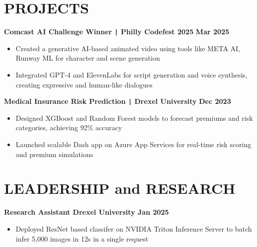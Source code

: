\documentclass[10pt]{article}
\begin{document}
\vspace{-0.75cm}
\section*{PROJECTS}
\vspace{-0.1cm}

\noindent
\textbf{Comcast AI Challenge Winner \texttt{|} Philly Codefest 2025} \hfill \textbf{Mar 2025} \\
\vspace{-0.4cm}
\begin{itemize}[leftmargin=0.6cm, itemsep=-0.1cm, topsep=0cm]

    \item Created a generative AI-based animated video using tools like META AI, Runway ML for character and scene generation

    \item Integrated GPT-4 and ElevenLabs for script generation and voice synthesis, creating expressive and human-like dialogues

\end{itemize}

\noindent
\textbf{Medical Insurance Risk Prediction \texttt{|} Drexel University} \hfill \textbf{Dec 2023} \\
\vspace{-0.4cm}
\begin{itemize}[leftmargin=0.6cm, itemsep=-0.1cm, topsep=0cm]

    \item Designed XGBoost and Random Forest models to forecast premiums and risk categories, achieving 92\% accuracy

    \item Launched scalable Dash app on Azure App Services for real-time risk scoring and premium simulations

\end{itemize}


\vspace{-0.4cm}
\section*{LEADERSHIP and RESEARCH}
\vspace{-0.1cm}

\noindent
\textbf{Research Assistant \textbar{} Drexel University \hfill Jan 2025} \\
\vspace{-0.4cm}
\begin{itemize}[leftmargin=0.6cm, itemsep=-0.1cm, topsep=0cm]

    \item Deployed ResNet based classifer on NVIDIA Triton Inference Server to batch infer 5,000 images in 12s in a single request

\end{itemize}
\end{document}
